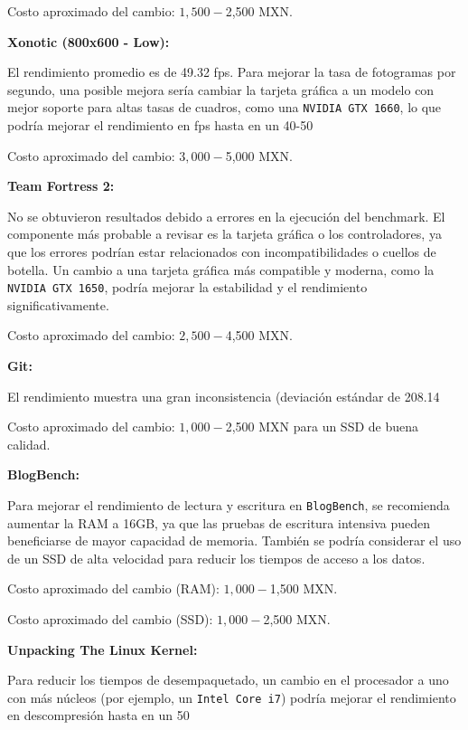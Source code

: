\documentclass[12pt]{article}
\begin{document}
\begin{enumerate}[(3.2.1)]
\begin{itemize}
Costo aproximado del cambio: $1,500 - $2,500 MXN.

\textbf{Xonotic (800x600 - Low):}

El rendimiento promedio es de 49.32 fps. Para mejorar la tasa de fotogramas por segundo, una posible mejora sería cambiar la tarjeta gráfica a un modelo con mejor soporte para altas tasas de cuadros, como una \texttt{NVIDIA GTX 1660}, lo que podría mejorar el rendimiento en fps hasta en un 40-50%

Costo aproximado del cambio: $3,000 - $5,000 MXN.

\textbf{Team Fortress 2:}

No se obtuvieron resultados debido a errores en la ejecución del benchmark. El componente más probable a revisar es la tarjeta gráfica o los controladores, ya que los errores podrían estar relacionados con incompatibilidades o cuellos de botella. Un cambio a una tarjeta gráfica más compatible y moderna, como la \texttt{NVIDIA GTX 1650}, podría mejorar la estabilidad y el rendimiento significativamente.

Costo aproximado del cambio: $2,500 - $4,500 MXN.

\textbf{Git:}

El rendimiento muestra una gran inconsistencia (deviación estándar de 208.14%

Costo aproximado del cambio: $1,000 - $2,500 MXN para un SSD de buena calidad.

\textbf{BlogBench:}

Para mejorar el rendimiento de lectura y escritura en \texttt{BlogBench}, se recomienda aumentar la RAM a 16GB, ya que las pruebas de escritura intensiva pueden beneficiarse de mayor capacidad de memoria. También se podría considerar el uso de un SSD de alta velocidad para reducir los tiempos de acceso a los datos.

Costo aproximado del cambio (RAM): $1,000 - $1,500 MXN.

Costo aproximado del cambio (SSD): $1,000 - $2,500 MXN.

\textbf{Unpacking The Linux Kernel:}

Para reducir los tiempos de desempaquetado, un cambio en el procesador a uno con más núcleos (por ejemplo, un \texttt{Intel Core i7}) podría mejorar el rendimiento en descompresión hasta en un 50%


\end{itemize}
\end{enumerate}
\end{document}
